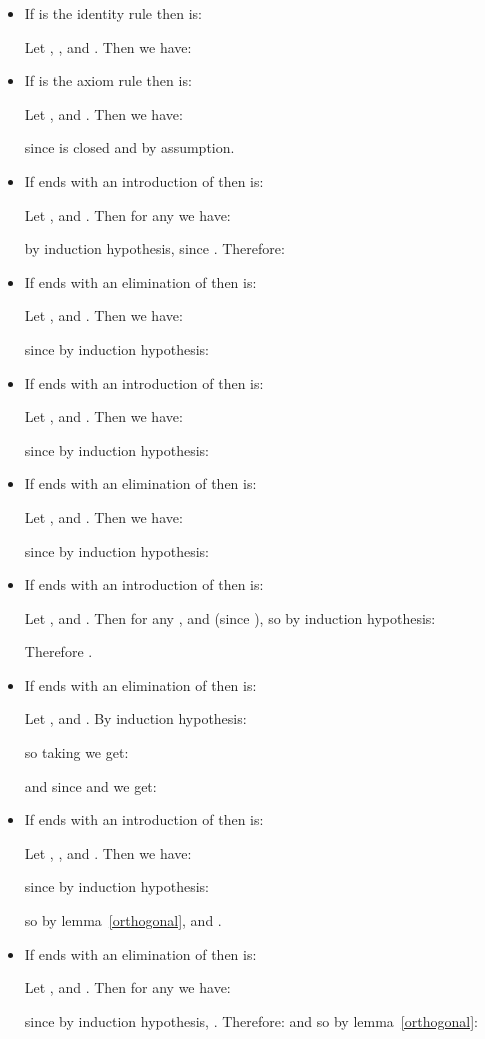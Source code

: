 \documentclass{CSML}
\begin{document}
\begin{itemize}
\item If  is the identity rule then  is:

Let , ,  and . Then we have:

\item If  is the axiom rule then  is:

Let ,  and . Then we have:

since  is closed and  by assumption.
\item If  ends with an introduction of  then  is:

Let ,  and . Then for any  we have:

by induction hypothesis, since . Therefore:

\item If  ends with an elimination of  then  is:

Let ,  and . Then we have:

since by induction hypothesis:

\item If  ends with an introduction of  then  is:

Let ,  and . Then we have:

since by induction hypothesis:

\item If  ends with an elimination of  then  is:

Let ,  and . Then we have:

since by induction hypothesis:

\item If  ends with an introduction of  then  is:

Let ,  and . Then for any ,  and  (since ), so by induction hypothesis:

Therefore .
\item If  ends with an elimination of  then  is:

Let ,  and . By induction hypothesis:

so taking  we get:

and since  and  we get:

\item If  ends with an introduction of  then  is:

Let , ,  and . Then we have:

since by induction hypothesis:

so  by lemma~\ref{orthogonal}, and .
\item If  ends with an elimination of  then  is:

Let ,  and . Then for any  we have:

since by induction hypothesis, . Therefore:
 and so by lemma~\ref{orthogonal}:


\end{itemize}
\end{document}
